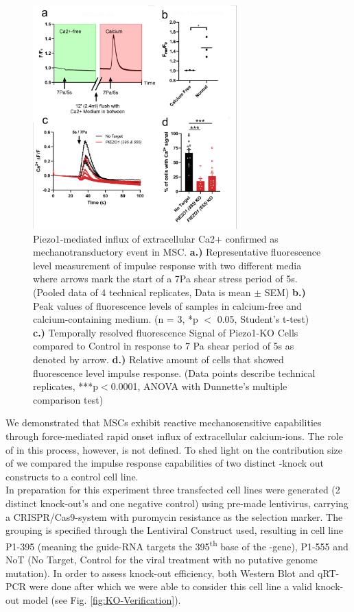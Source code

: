 \begin{figure}
\centering
\includegraphics[width = 0.7\textwidth]{Combined_CalciumFree_KnockOut.png}
\caption{Piezo1-mediated influx of extracellular Ca2+ confirmed as mechanotransductory event in MSC. \hfill \newline 
\textbf{a.)} Representative fluorescence level measurement of impulse response with two different media where arrows mark the start of a 7Pa shear stress period of 5s. (Pooled data of 4 technical replicates, Data is mean $\pm$ SEM)	
\textbf{b.)} Peak values of fluorescence levels of samples in calcium-free and calcium-containing medium. (n = 3, *p $<$ 0.05, Student's t-test) 
\textbf{c.)} Temporally resolved fluorescence Signal of Piezo1-KO Cells compared to Control in response to 7 Pa shear period of 5s as denoted by arrow.  
\textbf{d.)} Relative amount of cells that showed fluorescence level impulse response. (Data points describe technical replicates, ***p$<$0.0001, ANOVA with Dunnette's multiple comparison test)}
\label{fig:CalcImaging_Cells}
\end{figure}

We demonstrated that MSCs exhibit reactive mechanosensitive capabilities through force-mediated rapid onset influx of extracellular calcium-ions. The role of \Piezo{} in this process, however, is not defined. To shed light on the contribution size of \Piezo{} we compared the impulse response capabilities of two distinct \Piezo{}-knock out constructs to a control cell line.\\
In preparation for this experiment three transfected cell lines were generated (2 distinct \Piezo{} knock-out's and one negative control) using pre-made lentivirus, carrying a CRISPR/Cas9-system with puromycin resistance as the selection marker. The grouping is specified through the Lentiviral Construct used, resulting in cell line P1-395 (meaning the guide-RNA targets the 395\textsuperscript{th} base of the \Piezo{}-gene), P1-555 and NoT (No Target, Control for the viral treatment with no putative genome mutation).  In order to assess knock-out efficiency, both Western Blot and qRT-PCR were done after which we were able to consider this cell line a valid knock-out model (see Fig. \ref{fig:KO-Verification}).\\

